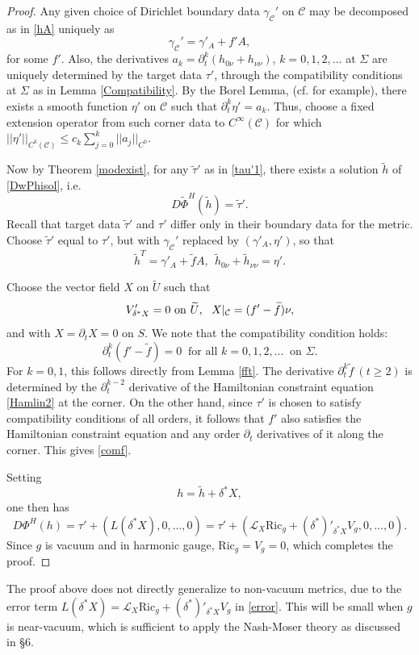 \documentclass[10pt]{amsart}
\newcommand{\g}{\gamma}
\renewcommand{\d}{\delta}
\newcommand{\Si}{\Sigma}
\newcommand{\cC}{{\mathcal C}}
\newcommand{\cL}{{\mathcal L}}
\newcommand{\Ric}{\mathrm{Ric}}
\newcommand{\be}{\begin{equation}}
\newcommand{\ee}{\end{equation}}
\newcommand{\p}{\partial}
\newcommand{\<}{\langle}
\renewcommand{\>}{\rangle}
\newcommand{\w}{\widetilde}
\theoremstyle{plain}
\theoremstyle{remark}
\theoremstyle{definition}
\numberwithin{equation}{section}
\begin{document}
 \begin{proof}

  Any given choice of Dirichlet boundary data $\g_{\cC}'$ on $\cC$ may be decomposed as in \eqref{hA} uniquely as 
\be \label{hT}
\g_{\cC}' = \g'_A + f' A,
\ee
for some $f'$. Also, the derivatives $a_k = \p_t^k(h_{0\nu} + h_{\nu \nu})$, $k = 0, 1, 2,\dots$ at $\Si$ are uniquely determined by the target data $\tau'$, 
through the compatibility conditions at $\Si$ as in Lemma \ref{Compatibility}. By the Borel Lemma, (cf.\cite[Thm.~1.2.6]{Ho} for example), there exists a 
smooth function $\eta'$ on $\cC$ such that $\p_t^k \eta' = a_k$. Thus, choose a fixed extension operator from such corner data to $C^{\infty}(\cC)$ for 
which $||\eta'||_{C^k(\cC)} \leq c_k \sum_{j=0}^k ||a_j||_{C^0}$. 

   Now by Theorem \ref{modexist}, for any $\w \tau'$ as in \eqref{tau'1}, there exists a solution $\w h$ of \eqref{DwPhisol}, i.e. 
$$D\w \Phi^H(\w h) = \w \tau'.$$
Recall that target data $\w \tau'$ and $\tau'$ differ only in their boundary data for the metric. 
Choose $\w \tau'$ equal to $\tau'$, but with $\g_{\cC}'$ replaced by $(\g'_A, \eta')$, so that 
 $$\w h^T = \g'_A + \w f A, \ \  \w h_{0\nu} +  \w h_{\nu \nu} = \eta'.$$
     
 Choose the vector field $X$ on $\w U$ such that 
 \be \label{Xgauge}
V'_{\d^*X} = 0  \ {\rm on} \ \w U,  \ \ X|_{\cC} = (f' - \w f)\nu ,
\ee
and with $X = \p_t X = 0$ on $S$. We note that the compatibility condition holds: 
\be\label{comf}
\p^k_t(f'-\w f)=0 \ \mbox{ for all } k=0,1,2,...\  \mbox{ on }\Si.
\ee 
For $k=0,1$, this follows directly from Lemma \ref{fft}. The derivative $\p^k_t \w f ~(t\geq 2)$ is determined by the $\p_t^{k-2}$ derivative of the Hamiltonian constraint 
equation \eqref{Hamlin2} at the corner. On the other hand, since $\tau'$ is chosen to satisfy compatibility conditions of all orders, it follows that $f'$ also satisfies the 
Hamiltonian constraint equation and any order $\p_t$ derivatives of it along the corner. This gives \eqref{comf}.  

    Setting 
$$h = \w h + \d^*X,$$
one then has 
\be\label{error}
D\Phi^H(h) = \tau' +(L(\d^* X), 0,...,0) = \tau' +(\cL_X \Ric_g+(\d^*)'_{\d^* X}V_g, 0,...,0).
\ee
Since $g$ is vacuum and in harmonic gauge, $\Ric_g = V_g = 0$, which completes the proof. 
 \end{proof}

   The proof above does not directly generalize to non-vacuum metrics, due to the error term $L(\d^*X) = \cL_X \Ric_g+(\d^*)'_{\d^* X}V_g$ in \eqref{error}. 
This will be small when $g$ is near-vacuum, which is sufficient to apply the Nash-Moser theory as discussed in \S 6. 
   
\end{document}
